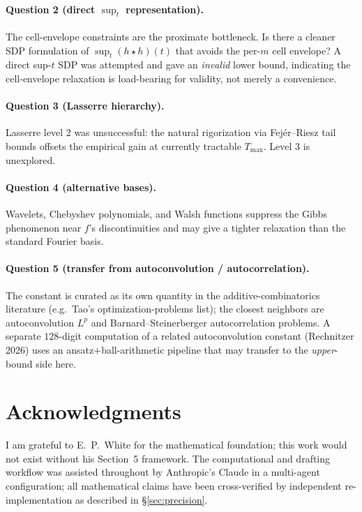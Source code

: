 \documentclass[11pt]{article}
\theoremstyle{plain}
\theoremstyle{definition}
\begin{document}
\paragraph{Question 2 (direct $\sup_t$ representation).}
The cell-envelope constraints are the proximate bottleneck. Is there a
cleaner SDP formulation of $\sup_t (h \star h)(t)$ that avoids the
per-$m$ cell envelope? A direct sup-$t$ SDP was attempted and gave an
\emph{invalid} lower bound, indicating the cell-envelope relaxation is
load-bearing for validity, not merely a convenience.

\paragraph{Question 3 (Lasserre hierarchy).}
Lasserre level 2 was unsuccessful: the natural rigorization via
Fej\'er--Riesz tail bounds offsets the empirical gain at currently
tractable $T_{\max}$. Level 3 is unexplored.

\paragraph{Question 4 (alternative bases).}
Wavelets, Chebyshev polynomials, and Walsh functions suppress the
Gibbs phenomenon near $f$'s discontinuities and may give a tighter
relaxation than the standard Fourier basis.

\paragraph{Question 5 (transfer from autoconvolution / autocorrelation).}
The constant is curated as its own quantity in the additive-combinatorics
literature (e.g.\ Tao's optimization-problems list); the closest
neighbors are autoconvolution $L^p$ and Barnard--Steinerberger
autocorrelation problems. A separate $128$-digit computation of a
related autoconvolution constant (Rechnitzer 2026) uses an
ansatz$+$ball-arithmetic pipeline that may transfer to the
\emph{upper}-bound side here.

\section{Acknowledgments}

I am grateful to E.~P.~White for the mathematical foundation; this
work would not exist without his Section~5 framework. The
computational and drafting workflow was assisted throughout by
Anthropic's Claude in a multi-agent configuration; all mathematical
claims have been cross-verified by independent re-implementation as
described in \S\ref{sec:precision}.
\end{document}
